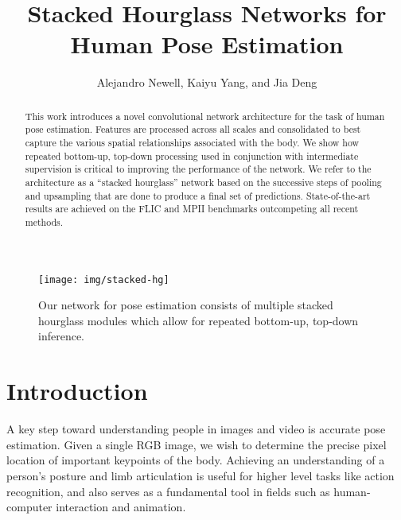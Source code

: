 \documentclass[runningheads]{llncs}
\begin{document}
\pagestyle{headings}
\mainmatter

\title{Stacked Hourglass Networks for \\ Human Pose Estimation}



\author{Alejandro Newell, Kaiyu Yang, and Jia Deng}

\maketitle

\begin{abstract}
  This work introduces a novel convolutional network architecture for
  the task of human pose estimation. Features are processed across all
  scales and consolidated to best capture the various spatial
  relationships associated with the body. We show how repeated
  bottom-up, top-down processing used in conjunction with intermediate
  supervision is critical to improving the performance of the
  network. We refer to the architecture as a ``stacked hourglass''
  network based on the successive steps of pooling and upsampling that
  are done to produce a final set of predictions. State-of-the-art
  results are achieved on the FLIC and MPII benchmarks outcompeting
  all recent methods.

\end{abstract}

\begin{figure}
\centering
\texttt{[image: img/stacked-hg]}
\caption{Our network for pose estimation consists of multiple stacked
  hourglass modules which allow for repeated bottom-up, top-down
  inference.}
\label{fig:stacked-hg}
\end{figure}



\section{Introduction}

A key step toward understanding people in images and video is accurate
pose estimation. Given a single RGB image, we wish to determine the
precise pixel location of important keypoints of the body. Achieving
an understanding of a person's posture and limb articulation is
useful for higher level tasks like action recognition, and also
serves as a fundamental tool in fields such as human-computer
interaction and animation.
\end{document}
